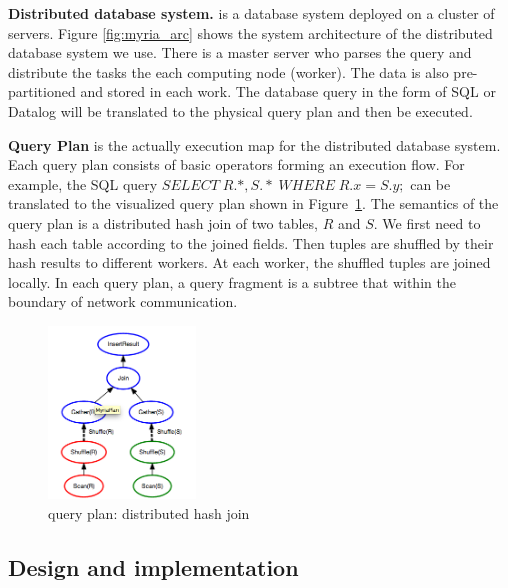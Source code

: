 \documentclass[11pt]{article}
\begin{document}
\noindent\textbf{Distributed database system.} is a database system deployed on a cluster of servers.  Figure \ref{fig:myria_arc} shows the system architecture of the distributed database system we use. There is a master server who parses the query and distribute the tasks the each computing node (worker). The data is also pre-partitioned and stored in each work.  The database query in the form of SQL or Datalog will be translated to the physical query plan and then be executed.

\noindent\textbf{Query Plan} is the actually execution map for the distributed database system.  Each query plan consists of basic operators forming an execution flow. For example, the SQL query $SELECT \; R.*, S.*  \; WHERE \; R.x=S.y ;$ can be translated to the visualized query plan shown in Figure~\ref{fig:query_plan}. The semantics of the query plan is a distributed hash join of two tables, $R$ and $S$. We first need to hash each table according to the joined fields. Then tuples are shuffled by their hash results to different workers. At each worker, the shuffled tuples are joined locally. In each query plan, a query fragment is a subtree that within the boundary of network communication.


\begin{figure}
 \begin{center}
     \includegraphics[width=0.35\textwidth]{partition_join.png}
   \end{center}
  \caption{query plan: distributed hash join}
  \label{fig:query_plan}
\end{figure}



\subsection{Design and implementation}
\end{document}
